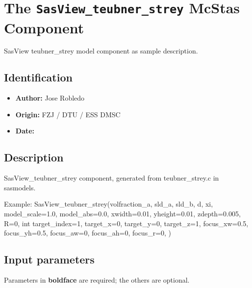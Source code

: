 \section{The \texttt{SasView\_teubner\_strey} McStas Component}
SasView teubner\_strey model component as sample description.

\subsection*{Identification}
\begin{itemize}
  \item \textbf{Author:} Jose Robledo
  \item \textbf{Origin:} FZJ / DTU / ESS DMSC
  \item \textbf{Date:} 
\end{itemize}

\subsection*{Description}
SasView\_teubner\_strey component, generated from teubner\_strey.c in sasmodels.

Example: SasView\_teubner\_strey(volfraction\_a, sld\_a, sld\_b, d, xi, model\_scale=1.0, model\_abs=0.0, xwidth=0.01, yheight=0.01, zdepth=0.005, R=0, int target\_index=1, target\_x=0, target\_y=0, target\_z=1, focus\_xw=0.5, focus\_yh=0.5, focus\_aw=0, focus\_ah=0, focus\_r=0, )

\subsection*{Input parameters}
Parameters in \textbf{boldface} are required; the others are optional.

